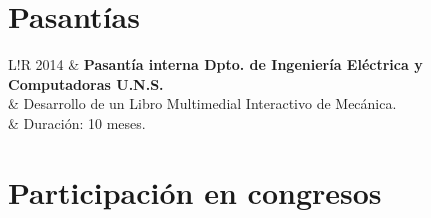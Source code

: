 \documentclass[10pt]{article}
\newcommand\VRule{\color{lightgray}\vrule width 0.5pt}
\begin{document}
\section{Pasantías}
\begin{tabular}{L!{\VRule}R}
2014 & {\bf Pasantía interna Dpto. de Ingeniería Eléctrica y Computadoras U.N.S.} \\
	 & Desarrollo de un Libro Multimedial Interactivo de Mecánica. \\
	 & Duración: 10 meses. \\
\end{tabular}

\newpage

\section{Participación en congresos}
\end{document}
